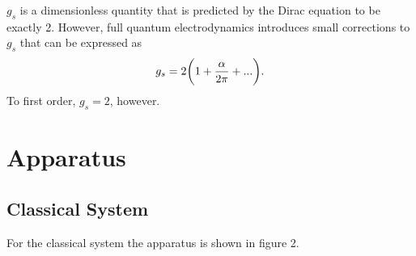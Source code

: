 \documentclass{article}
\begin{document}
	\vspace{.25cm}

	$g_s$ is a dimensionless quantity that is predicted by the Dirac equation to be exactly 2.  However, full quantum electrodynamics introduces small corrections to $g_s$ that can be expressed as
	\begin{equation*}
		g_s = 2\bigg{(}1+\frac{\alpha}{2\pi} + ...\bigg{)}.
	\end{equation*}
	To first order, $g_s = 2$, however.




\section{Apparatus}
	\subsection{Classical System}
	For the classical system the apparatus is shown in figure 2.

	\vspace{.25cm}
\end{document}

